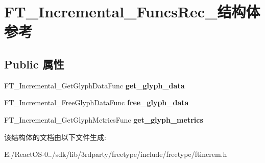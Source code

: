 \hypertarget{struct_f_t___incremental___funcs_rec__}{}\section{F\+T\+\_\+\+Incremental\+\_\+\+Funcs\+Rec\+\_\+结构体 参考}
\label{struct_f_t___incremental___funcs_rec__}
\subsection*{Public 属性}
\begin{DoxyCompactItemize}
\item 
\mbox{\label{struct_f_t___incremental___funcs_rec___ac276b7ff9624b8d8bf144ab8d00538b4}} 
F\+T\+\_\+\+Incremental\+\_\+\+Get\+Glyph\+Data\+Func {\bfseries get\+\_\+glyph\+\_\+data}
\item 
\mbox{\label{struct_f_t___incremental___funcs_rec___a9201afcfda8c15be839aee04306dff0a}} 
F\+T\+\_\+\+Incremental\+\_\+\+Free\+Glyph\+Data\+Func {\bfseries free\+\_\+glyph\+\_\+data}
\item 
\mbox{\label{struct_f_t___incremental___funcs_rec___ac7d95e85357ab9d1893660b0628c1908}} 
F\+T\+\_\+\+Incremental\+\_\+\+Get\+Glyph\+Metrics\+Func {\bfseries get\+\_\+glyph\+\_\+metrics}
\end{DoxyCompactItemize}


该结构体的文档由以下文件生成\+:\begin{DoxyCompactItemize}
\item 
E\+:/\+React\+O\+S-\/0../sdk/lib/3rdparty/freetype/include/freetype/ftincrem.\+h\end{DoxyCompactItemize}
